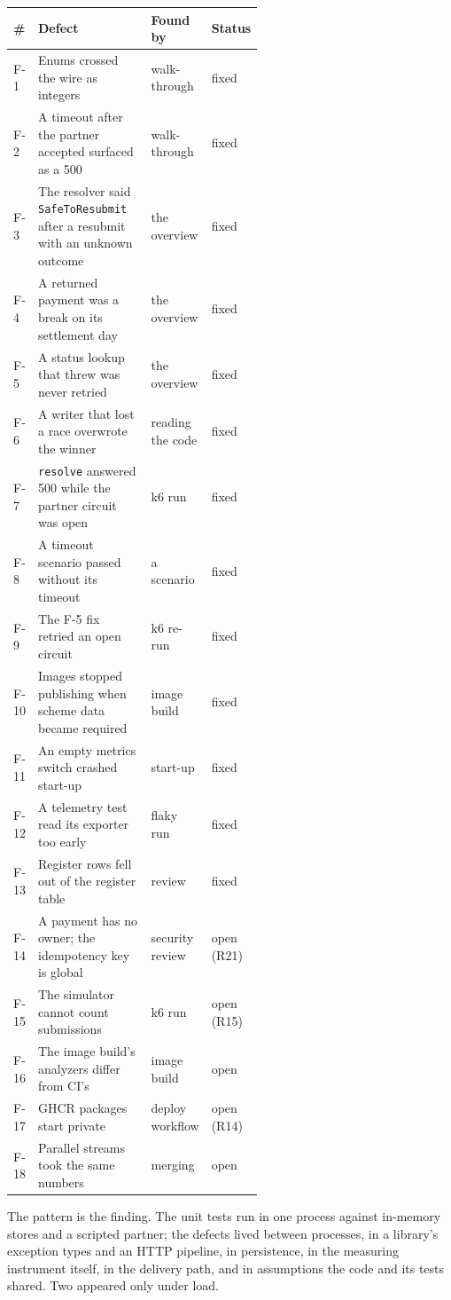 \documentclass[11pt,a4paper]{article}
\begin{document}
\begin{longtable}{@{}l p{0.56\linewidth} l l@{}}
\toprule
\# & Defect & Found by & Status \\
\midrule
\endhead
F-1 & Enums crossed the wire as integers & walk-through & fixed \\
F-2 & A timeout after the partner accepted surfaced as a 500 & walk-through & fixed \\
F-3 & The resolver said \texttt{SafeToResubmit} after a resubmit with an unknown outcome & the overview & fixed \\
F-4 & A returned payment was a break on its settlement day & the overview & fixed \\
F-5 & A status lookup that threw was never retried & the overview & fixed \\
F-6 & A writer that lost a race overwrote the winner & reading the code & fixed \\
F-7 & \texttt{resolve} answered 500 while the partner circuit was open & k6 run & fixed \\
F-8 & A timeout scenario passed without its timeout & a scenario & fixed \\
F-9 & The F-5 fix retried an open circuit & k6 re-run & fixed \\
F-10 & Images stopped publishing when scheme data became required & image build & fixed \\
F-11 & An empty metrics switch crashed start-up & start-up & fixed \\
F-12 & A telemetry test read its exporter too early & flaky run & fixed \\
F-13 & Register rows fell out of the register table & review & fixed \\
F-14 & A payment has no owner; the idempotency key is global & security review & open (R21) \\
F-15 & The simulator cannot count submissions & k6 run & open (R15) \\
F-16 & The image build's analyzers differ from CI's & image build & open \\
F-17 & GHCR packages start private & deploy workflow & open (R14) \\
F-18 & Parallel streams took the same numbers & merging & open \\
\bottomrule
\end{longtable}

The pattern is the finding. The unit tests run in one process against in-memory stores and a
scripted partner; the defects lived between processes, in a library's exception types and an HTTP
pipeline, in persistence, in the measuring instrument itself, in the delivery path, and in
assumptions the code and its tests shared. Two appeared only under load. 
\end{document}
